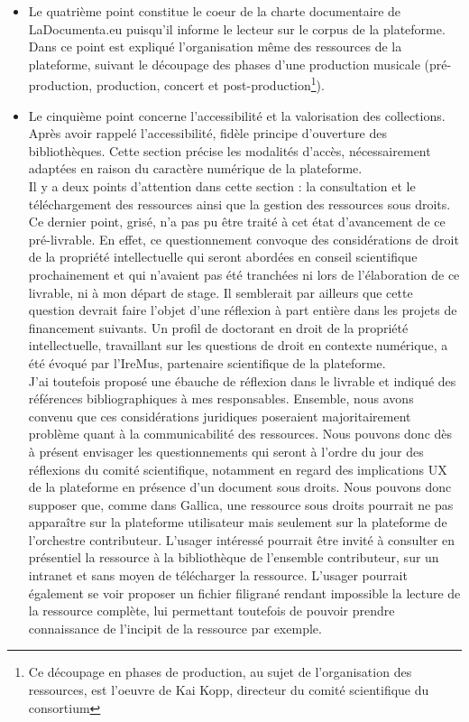 \begin{itemize}
\begin{itemize}
		\item Le quatrième point constitue le coeur de la charte documentaire de LaDocumenta.eu puisqu'il informe le lecteur sur le corpus de la plateforme. Dans ce point est expliqué l'organisation même des ressources de la plateforme, suivant le découpage des phases d'une production musicale (pré-production, production, concert et post-production\footnote{Ce découpage en phases de production, au sujet de l'organisation des ressources, est l'oeuvre de Kai Kopp, directeur du comité scientifique du consortium}).
		\item Le cinquième point concerne l'accessibilité et la valorisation des collections. Après avoir rappelé l'accessibilité, fidèle principe d'ouverture des bibliothèques. Cette section précise les modalités d'accès, nécessairement adaptées en raison du caractère numérique de la plateforme.\\ 
		Il y a deux points d'attention dans cette section : la consultation et le téléchargement des ressources ainsi que la gestion des ressources sous droits.\\
	Ce dernier point, grisé, n'a pas pu être traité à cet état d'avancement de ce pré-livrable. En effet, ce questionnement convoque des considérations de droit de la propriété intellectuelle qui seront abordées en conseil scientifique prochainement et qui n'avaient pas été tranchées ni lors de l'élaboration de ce livrable, ni à mon départ de stage. Il semblerait par ailleurs que cette question devrait faire l'objet d'une réflexion à part entière dans les projets de financement suivants. Un profil de doctorant en droit de la propriété intellectuelle, travaillant sur les questions de droit en contexte numérique, a été évoqué par l'IreMus, partenaire scientifique de la plateforme. \\
	J'ai toutefois proposé une ébauche de réflexion dans le livrable et indiqué des références bibliographiques à mes responsables. Ensemble, nous avons convenu que ces considérations juridiques poseraient majoritairement problème quant à la communicabilité des ressources. Nous pouvons donc dès à présent envisager les questionnements qui seront à l'ordre du jour des réflexions du comité scientifique, notamment en regard des implications UX de la plateforme en présence d'un document sous droits. Nous pouvons donc supposer que, comme dans Gallica, une ressource sous droits pourrait ne pas apparaître sur la plateforme utilisateur mais seulement sur la plateforme de l'orchestre contributeur. L'usager intéressé pourrait être invité à consulter en présentiel la ressource à la bibliothèque de l'ensemble contributeur, sur un intranet et sans moyen de télécharger la ressource. L'usager pourrait également se voir proposer un fichier filigrané rendant impossible la lecture de la ressource complète, lui permettant toutefois de pouvoir prendre connaissance de l'incipit de la ressource par exemple. 

\end{itemize}
\end{itemize}
